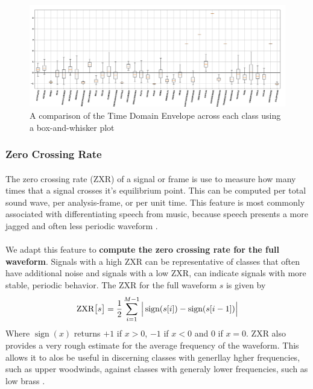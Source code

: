\documentclass[12pt,letterpaper]{article}
\DeclareMathOperator{\sign}{\text{sign}}
\begin{document}
\begin{figure}[H]
\begin{center}
\includegraphics[scale=0.3]{../FiguresFeatures/Time_Domain_Env}
\end{center}
\caption{A comparison of the Time Domain Envelope across each class using a box-and-whisker plot}
\label{fig-FeatureTDE}
\end{figure}


\subsubsection{Zero Crossing Rate}

\paragraph*{}The zero crossing rate (ZXR) of a signal or frame is use to measure how many times that a signal crosses it's equilibrium point. This can be computed per total sound wave, per analysis-frame, or per unit time. This feature is most commonly associated with differentiating speech from music, because speech presents a more jagged and often less periodic waveform \cite{Kahn,Liu,Zhang}. 

\paragraph*{}We adapt this feature to \textbf{compute the zero crossing rate for the full waveform}. Signals with a high ZXR can be representative of classes that often have additional noise and signals with a low ZXR, can indicate signals with more stable, periodic behavior. The ZXR for the full waveform $s$ is given by \cite{Serizel,Liu}
\begin{equation}
\label{eqn-ZXR}
\text{ZXR}\big[ s \big] = \frac{1}{2} \sum_{i=1}^{M-1} \Big{|} \sign(s[i]) - \sign(s[i-1]) \Big{|} 
\end{equation}
Where $\sign(x)$ returns $+1$ if $x > 0$, $-1$ if $x < 0$ and $0$ if $x = 0$. ZXR also provides a very rough estimate for the average frequency of the waveform. This allows it to alos be useful in discerning classes with generllay hgher frequencies, such as upper woodwinds, against classes with generaly lower frequencies, such as low brass \cite{White}.
\end{document}
